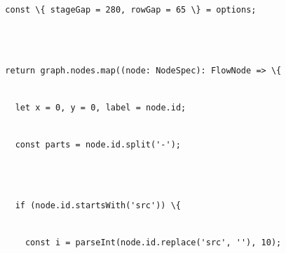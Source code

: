 \documentclass[
]{article}
\newcommand{\passthrough}[1]{#1}
\begin{document}
\passthrough{\lstinline!  !}\passthrough{\lstinline!const!}\passthrough{\lstinline! !}\passthrough{\lstinline!\{!}\passthrough{\lstinline! !}\passthrough{\lstinline!stageGap!}\passthrough{\lstinline! !}\passthrough{\lstinline!=!}\passthrough{\lstinline! !}\passthrough{\lstinline!280,!}\passthrough{\lstinline! !}\passthrough{\lstinline!rowGap!}\passthrough{\lstinline! !}\passthrough{\lstinline!=!}\passthrough{\lstinline! !}\passthrough{\lstinline!65!}\passthrough{\lstinline! !}\passthrough{\lstinline!\}!}\passthrough{\lstinline! !}\passthrough{\lstinline!=!}\passthrough{\lstinline! !}\passthrough{\lstinline!options;!}\strut \\
\strut \\
\passthrough{\lstinline!  !}\passthrough{\lstinline!return!}\passthrough{\lstinline! !}\passthrough{\lstinline!graph.nodes.map!}\passthrough{\lstinline!((node:!}\passthrough{\lstinline! !}\passthrough{\lstinline!NodeSpec!}\passthrough{\lstinline!):!}\passthrough{\lstinline! !}\passthrough{\lstinline!FlowNode!}\passthrough{\lstinline! !}\passthrough{\lstinline!=>!}\passthrough{\lstinline! !}\passthrough{\lstinline!\{!}\strut \\
\passthrough{\lstinline!    !}\passthrough{\lstinline!let!}\passthrough{\lstinline! !}\passthrough{\lstinline!x!}\passthrough{\lstinline! !}\passthrough{\lstinline!=!}\passthrough{\lstinline! !}\passthrough{\lstinline!0,!}\passthrough{\lstinline! !}\passthrough{\lstinline!y!}\passthrough{\lstinline! !}\passthrough{\lstinline!=!}\passthrough{\lstinline! !}\passthrough{\lstinline!0,!}\passthrough{\lstinline! !}\passthrough{\lstinline!label!}\passthrough{\lstinline! !}\passthrough{\lstinline!=!}\passthrough{\lstinline! !}\passthrough{\lstinline!node.id;!}\strut \\
\passthrough{\lstinline!    !}\passthrough{\lstinline!const!}\passthrough{\lstinline! !}\passthrough{\lstinline!parts!}\passthrough{\lstinline! !}\passthrough{\lstinline!=!}\passthrough{\lstinline! !}\passthrough{\lstinline!node.id.split!}\passthrough{\lstinline!('-');!}\strut \\
\strut \\
\passthrough{\lstinline!    !}\passthrough{\lstinline!if!}\passthrough{\lstinline! !}\passthrough{\lstinline!(!}\passthrough{\lstinline!node.id.startsWith!}\passthrough{\lstinline!('!}\passthrough{\lstinline!src!}\passthrough{\lstinline!'))!}\passthrough{\lstinline! !}\passthrough{\lstinline!\{!}\strut \\
\passthrough{\lstinline!      !}\passthrough{\lstinline!const!}\passthrough{\lstinline! !}\passthrough{\lstinline!i!}\passthrough{\lstinline! !}\passthrough{\lstinline!=!}\passthrough{\lstinline! !}\passthrough{\lstinline!parseInt!}\passthrough{\lstinline!(!}\passthrough{\lstinline!node.id.replace!}\passthrough{\lstinline!('!}\passthrough{\lstinline!src!}\passthrough{\lstinline!',!}\passthrough{\lstinline! !}\passthrough{\lstinline!''),!}\passthrough{\lstinline! !}\passthrough{\lstinline!10);!}\strut \\
\end{document}
